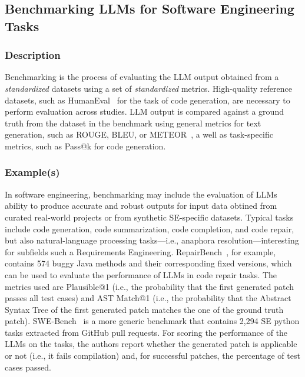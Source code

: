 \subsection{Benchmarking LLMs for Software Engineering Tasks}

\subsubsection{Description}

Benchmarking is the process of evaluating the LLM output obtained from a \emph{standardized} datasets using a set of \emph{standardized} metrics.
High-quality reference datasets, such as HumanEval~\cite{DBLP:journals/corr/abs-2107-03374} for the task of code generation, are necessary to perform evaluation across studies.
LLM output is compared against a ground truth from the dataset in the benchmark using general metrics for text generation, such as ROUGE, BLEU, or METEOR~\cite{10.1145/3695988}, a well as task-specific metrics, such as Pass@k for code generation.

\subsubsection{Example(s)}

In software engineering, benchmarking may include the evaluation of LLMs ability to produce accurate and robust outputs for input data obtined from curated real-world projects or from synthetic SE-specific datasets. Typical tasks include code generation, code summarization, code completion, and code repair, but also natural-language processing tasks---i.e., anaphora resolution---interesting for subfields such a Requirements Engineering. 
RepairBench~\cite{silva2024repairbench}, for example, contains 574 buggy Java methods and their corresponding fixed versions, which can be used to evaluate the performance of LLMs in code repair tasks.
The metrics used are Plausible@1 (i.e., the probability that the first generated patch passes all test cases) and AST Match@1 (i.e., the probability that the Abstract Syntax Tree of the first generated patch matches the one of the ground truth patch).
SWE-Bench~\cite{DBLP:conf/iclr/JimenezYWYPPN24} is a more generic benchmark that contains 2,294 SE python tasks extracted from GitHub pull requests.
For scoring the performance of the LLMs on the tasks, the authors report whether the generated patch is applicable or not (i.e., it fails compilation) and, for successful patches, the percentage of test cases passed.

